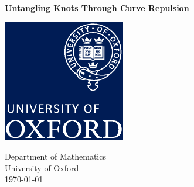 \documentclass[../dissertation.tex]{subfiles}
\begin{document}
\begin{titlepage}
    \begin{center}
        \vspace*{1cm}

        \Huge
        \textbf{Untangling Knots Through Curve Repulsion}

        \vspace{0.5cm}

        \vspace{1.5cm}


        \vfill



        \includegraphics[width=0.4\textwidth]{oxfordlogo}

        \vspace{0.3\textheight}

        \large
        Department of Mathematics\\
        University of Oxford\\
        \today

    \end{center}
\end{titlepage}
\end{document}
